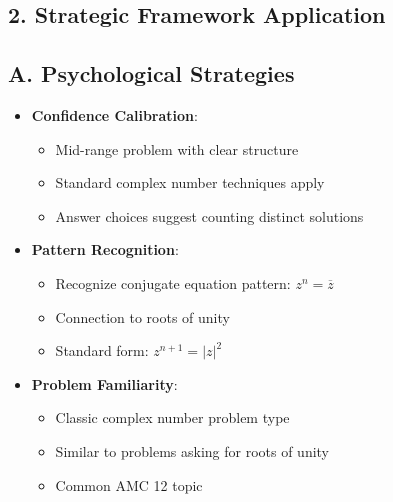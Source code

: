 \documentclass[11pt]{article}
\begin{document}
\begin{strategybox}
\section*{2. Strategic Framework Application}

\subsection*{A. Psychological Strategies}
\begin{itemize}[leftmargin=*]
    \item \textbf{Confidence Calibration}: 
    \begin{itemize}
        \item Mid-range problem with clear structure
        \item Standard complex number techniques apply
        \item Answer choices suggest counting distinct solutions
    \end{itemize}
    \item \textbf{Pattern Recognition}:
    \begin{itemize}
        \item Recognize conjugate equation pattern: $z^n = \overline{z}$
        \item Connection to roots of unity
        \item Standard form: $z^{n+1} = |z|^2$
    \end{itemize}
    \item \textbf{Problem Familiarity}:
    \begin{itemize}
        \item Classic complex number problem type
        \item Similar to problems asking for roots of unity
        \item Common AMC 12 topic
    \end{itemize}
\end{itemize}


\end{strategybox}
\end{document}
